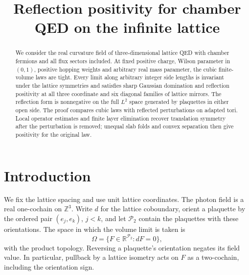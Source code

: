   \RequirePackage[backend=biber,style=alphabetic,backref=true,
    giveninits=true,isbn=false,date=year]{biblatex}
  
  \setcounter{biburlnumpenalty}{100}
  \setcounter{biburllcpenalty}{100}
  \setcounter{biburlucpenalty}{100}
  \renewcommand*{\bibfont}{\footnotesize}
\makeatother
\newcommand{\R}{\mathbb R}
\newcommand{\C}{\mathbb C}
\newcommand{\Z}{\mathbb Z}
\newcommand{\N}{\mathbb N}
\newcommand{\E}{\mathbb E}
\newcommand{\dd}{\mathrm d}
\DeclareMathOperator{\supp}{supp}
\DeclareMathOperator{\tr}{tr}
\DeclareMathOperator{\diag}{diag}
\allowdisplaybreaks[2]
\title[Reflection positivity on the infinite lattice]{Reflection positivity for chamber QED on the infinite lattice}
\date{}

\begin{abstract}
We consider the real curvature field of three-dimensional lattice QED
with chamber fermions and all flux sectors included. At fixed positive
charge, Wilson parameter in $(0,1)$, positive hopping weights and
arbitrary real mass parameter, the cubic finite-volume laws are tight.
Every limit along arbitrary integer side lengths is invariant under
the lattice symmetries and satisfies sharp Gaussian domination and
reflection positivity at all three coordinate and six diagonal
families of lattice mirrors. The reflection form is nonnegative on
the full $L^2$ space generated by plaquettes in either open side.
The proof compares cubic laws with reflected perturbations on adapted
tori. Local operator estimates and finite layer elimination recover
translation symmetry after the perturbation is removed; unequal slab
folds and convex separation then give positivity for the original law.
\end{abstract}
\maketitle
\tableofcontents
\section{Introduction}\label{sec:introduction}

We fix the lattice spacing and use unit lattice coordinates. The photon
field is a real one-cochain on $\Z^3$. Write $d$ for the lattice
coboundary, orient a plaquette by the ordered pair $(e_j,e_k)$, $j<k$,
and let $\mathcal P_2$ contain the plaquettes with these orientations.
The space in which the volume limit is taken is
\[
 \Omega=\{F\in\R^{\mathcal P_2}:dF=0\},
\]
with the product topology. Reversing a plaquette's orientation negates
its field value. In particular, pullback by a lattice isometry acts on
$F$ as a two-cochain, including the orientation sign.

